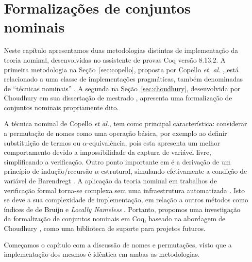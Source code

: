 \chapter{Formalizações de conjuntos nominais}\label{chp:formalizacao}

Neste capítulo apresentamos duas metodologias distintas de implementação da teoria nominal, desenvolvidas no assistente de provas Coq versão 8.13.2.
A primeira metodologia na Seção~\ref{sec:copello}, proposta por Copello \textit{et. al.} \cite{Copello2016}, está relacionado a uma classe de implementações pragmáticas, também denominadas de ``técnicas nominais'' \cite{Aydemir2007,Copello2016,Tasistro2015,Copello2018,Ambal2020}. A segunda na Seção~\ref{sec:choudhury}, desenvolvida por Choudhury em sua dissertação de mestrado \cite{Choudhury2015}, apresenta uma formalização de conjuntos nominais propriamente dito.

A técnica nominal de Copello \textit{et al.}, tem como principal característica: considerar a permutação de nomes como uma operação básica, por exemplo ao definir substituição de termos ou $\alpha$-equivalência, pois esta apresenta um melhor comportamento devido a impossibilidade da captura de variável livre, simplificando a verificação. Outro ponto importante em \cite{Copello2016} é a derivação de um princípio de indução/recursão $\alpha$-estrutural, simulando efetivamente a condição de variável de Barendregt \cite[BVC]{Barendregt2012}.
A aplicação da teoria nominal em trabalhos de verificação formal torna-se complexa sem uma infraestrutura automatizada \cite{Aydemir2008}. Isto se deve a sua complexidade de implementação, em relação a outros métodos como índices de de Bruijn \cite{Bruijn1972} e \textit{Locally Nameless} \cite{Chargueraud2011}.
Portanto, propomos uma investigação da formalização de conjuntos nominais em Coq, baseado na abordagem de Choudhury \cite{Choudhury2015}, como uma biblioteca de suporte para projetos futuros.

Começamos o capítulo com a discussão de nomes e permutações, visto que a implementação dos mesmos é idêntica em ambas as metodologias.

